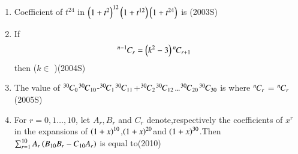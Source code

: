 \documentclass[journal]{IEEEtran}
\begin{document}
\begin{enumerate}
\begin{enumerate}
\end{enumerate}
\item Coefficient of $t^{24}$ in $\left({1+t^2}\right)^{12}\left(1+t^{12}\right)\left(1+t^{24}\right)$ is \hfill(2003S)
\begin{enumerate}
\end{enumerate}
\item If 
\begin{align}
{{}^{n-1}\mkern-1muC_{r}} &= \left(k^2-3\right) {{}^{n}\mkern-1muC_{r+1}} \notag
\end{align}
then ($k \in $ )\hfill(2004S)

\begin{enumerate}
\begin{multicols}{2}
    \item $(-8,-2]$
    \item $[2,\infty)$
    \item$\sbrak{-\sqrt{3},\sqrt{3}}$
    \item$(\sqrt{3},2]$
    \end{multicols}
\end{enumerate}

\item The value of
	${{}^{30}\mkern-1muC_{0}}$${{}^{30}\mkern-1muC_{10}}$-${{}^{30}\mkern-1muC_{1}}$${{}^{30}\mkern-1muC_{11}}$+${{}^{30}\mkern-1muC_{2}}$${{}^{30}\mkern-1muC_{12}}$\dots${{}^{30}\mkern-1muC_{20}}$${{}^{30}\mkern-1muC_{30}}$ is where ${{}^{n}\mkern-1muC_{r}}$ = ${{}^{n}\mkern-1muC_{r}}$\hfill(2005S)
\begin{enumerate}
\end{enumerate}
\item For $r=0,1\dots,10$, let $A_r,B_r$ and $C_r$ denote,respectively the coefficients of $x^r$ in the expansions of $\left(1+x\right)^{10}$,$\left(1+x\right)^{20}$and $\left(1+x\right)^{30}$.Then $\sum_{r=1}^{10}A_r\left(B_{10}B_r-C_{10}A_r\right)$ is equal to\hfill(2010)
\begin{enumerate}
\end{enumerate}


\end{enumerate}
\end{document}
